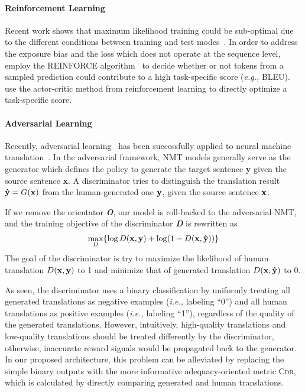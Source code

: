 \documentclass[letterpaper]{article} \usepackage{aaai19}  \usepackage{times}  \usepackage{helvet}  \usepackage{courier}  \usepackage{url}  \usepackage{graphicx}  \frenchspacing  \setlength{\pdfpagewidth}{8.5in}  \setlength{\pdfpageheight}{11in}  \usepackage{amsmath}
\begin{document}
\paragraph{Reinforcement Learning}
Recent work shows that maximum likelihood training could be sub-optimal due to the different conditions between training and test modes~\cite{bengio2015scheduled,Ranzato:2016:ICLR}. In order to address the exposure bias and the loss which does not operate at the sequence level, \citeauthor{Ranzato:2016:ICLR}~ employ the REINFORCE algorithm~\cite{williams1992simple} to decide whether or not tokens from a sampled prediction could contribute to a high task-specific score (\emph{e.g.,}\xspace BLEU). \citeauthor{bahdanau2016actor}~ use the actor-critic method from reinforcement learning to directly optimize a task-specific score. 




\paragraph{Adversarial Learning}
Recently, adversarial learning~\cite{goodfellow2014generative} has been successfully applied to neural machine translation~\cite{wu2017adversarial,Yang:2018:NAACL,Cheng:2018:ACL}.
In the adversarial framework, NMT models generally serve as the generator which defines the policy to generate the target sentence {\bf y} given the source sentence {\bf x}.
A discriminator tries to distinguish the translation result ${\bf \hat{y}} = G({\bf x})$ from the human-generated one ${\bf y}$, given the source sentence ${\bf x}$.



If we remove the orientator {\bf \em O}, our model is roll-backed to the adversarial NMT, and the training objective of the discriminator {\bf \em D} is rewritten as
\begin{eqnarray}
\max_{D} \{\log D({\bf x}, {\bf y}) + \log (1-D({\bf x}, {\bf \hat{y}})) \} \end{eqnarray}
The goal of the discriminator is try to maximize the likelihood of human translation $D({\bf x}, {\bf y})$ to 1 and minimize that of generated translation $D({\bf x}, {\bf \hat{y}})$ to 0.


As seen, the discriminator uses a binary classification by uniformly treating all generated translations as negative examples (\emph{i.e.,}\xspace labeling ``0'') and all human translations as positive examples (\emph{i.e.,}\xspace labeling ``1''), regardless of the quality of the generated translations. However, intuitively, high-quality translations and low-quality translations should be treated differently by the discriminator, otherwise, inaccurate reward signals would be propagated back to the generator. In our proposed architecture, this problem can be alleviated by replacing the simple binary outputs with the more informative adequacy-oriented metric \textsc{Cdr}, which is calculated by directly comparing generated and human translations.
\end{document}
